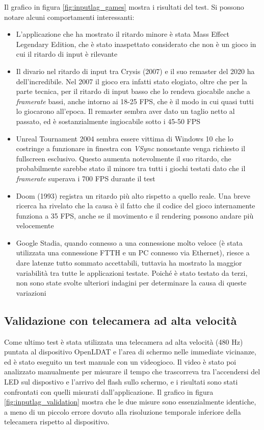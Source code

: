 Il grafico in figura \ref{fig:inputlag_games} mostra i risultati del test. Si possono notare alcuni comportamenti interessanti: \begin{itemize}
	\item L'applicazione che ha mostrato il ritardo minore è stata Mass Effect Legendary Edition, che è stato inaspettato considerato che non è un gioco in cui il ritardo di input è rilevante
	\item Il divario nel ritardo di input tra Crysis (2007) e il suo remaster del 2020 ha dell'incredibile. Nel 2007 il gioco era infatti stato elogiato, oltre che per la parte tecnica, per il ritardo di input basso che lo rendeva giocabile anche a \textit{framerate} bassi, anche intorno ai 18-25 FPS, che è il modo in cui quasi tutti lo giocarono all'epoca. Il remaster sembra aver dato un taglio netto al passato, ed è sostanzialmente ingiocabile sotto i 45-50 FPS
	\item Unreal Tournament 2004 sembra essere vittima di Windows 10 che lo costringe a funzionare in finestra con \textit{VSync} nonostante venga richiesto il fullscreen esclusivo. Questo aumenta notevolmente il suo ritardo, che probabilmente sarebbe stato il minore tra tutti i giochi testati dato che il \textit{framerate} superava i 700 FPS durante il test
	\item Doom (1993) registra un ritardo più alto rispetto a quello reale. Una breve ricerca ha rivelato che la causa è il fatto che il codice del gioco internamente funziona a 35 FPS, anche se il movimento e il rendering possono andare più velocemente
	\item Google Stadia, quando connesso a una connessione molto veloce (è stata utilizzata una connessione FTTH e un PC connesso via Ethernet), riesce a dare latenze tutto sommato accettabili, tuttavia ha mostrato la maggior variabilità tra tutte le applicazioni testate. Poiché è stato testato da terzi, non sono state svolte ulteriori indagini per determinare la causa di queste variazioni
\end{itemize}

\subsection{Validazione con telecamera ad alta velocità}
Come ultimo test è stata utilizzata una telecamera ad alta velocità (480 Hz) puntata al dispositivo OpenLDAT e l'area di schermo nelle immediate vicinanze, ed è stato eseguito un test manuale con un videogioco. Il video è stato poi analizzato manualmente per misurare il tempo che trascorreva tra l'accendersi del LED sul dispostivo e l'arrivo del flash sullo schermo, e i risultati sono stati confrontati con quelli misurati dall'applicazione. Il grafico in figura \ref{fig:inputlag_validation} mostra che le due misure sono essenzialmente identiche, a meno di un piccolo errore dovuto alla risoluzione temporale inferiore della telecamera rispetto al dispositivo.

